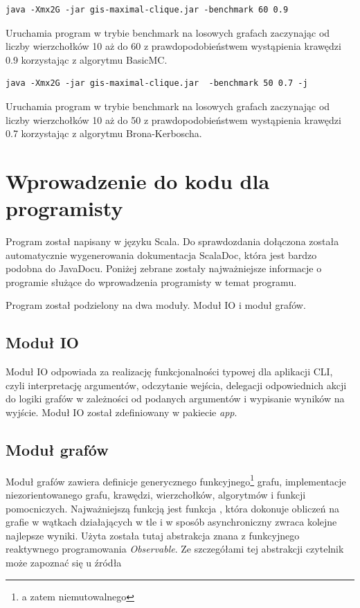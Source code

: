 \documentclass[12pt, a4paper]{article}
\begin{document}
\begin{verbatim}
java -Xmx2G -jar gis-maximal-clique.jar -benchmark 60 0.9
\end{verbatim}
Uruchamia program w trybie benchmark na losowych grafach zaczynając od liczby wierzchołków 10 aż do 60 z prawdopodobieństwem wystąpienia krawędzi 0.9 korzystając z algorytmu BasicMC.

\begin{verbatim}
java -Xmx2G -jar gis-maximal-clique.jar  -benchmark 50 0.7 -j
\end{verbatim}
Uruchamia program w trybie benchmark na losowych grafach zaczynając od liczby wierzchołków 10 aż do 50 z prawdopodobieństwem wystąpienia krawędzi 0.7 korzystając z algorytmu Brona-Kerboscha.

\section{Wprowadzenie do kodu dla programisty}
Program został napisany w języku Scala. Do sprawdozdania dołączona została automatycznie wygenerowania dokumentacja ScalaDoc, która jest bardzo podobna do JavaDocu. Poniżej zebrane zostały najważniejsze informacje o programie służące do wprowadzenia programisty w temat programu.

Program został podzielony na dwa moduły. Moduł IO i moduł grafów. 

\subsection{Moduł IO}
Moduł IO odpowiada za realizację funkcjonalności typowej dla aplikacji CLI, czyli interpretację argumentów, odczytanie wejścia, delegacji odpowiednich akcji do logiki grafów w zależności od podanych argumentów i wypisanie wyników na wyjście. Moduł IO został zdefiniowany w pakiecie \emph{app}.

\subsection{Moduł grafów}
Moduł grafów zawiera definicje generycznego funkcyjnego\footnote{a zatem niemutowalnego} grafu, implementacje niezorientowanego grafu, krawędzi, wierzchołków, algorytmów i funkcji pomocniczych. Najważniejszą funkcją jest funkcja , która dokonuje obliczeń na grafie w wątkach działających w tle i w sposób asynchroniczny zwraca kolejne najlepsze wyniki. Użyta została tutaj abstrakcja znana z funkcyjnego reaktywnego programowania \emph{Observable}. Ze szczegółami tej abstrakcji czytelnik może zapoznać się u źródła \cite{rx}
\end{document}
